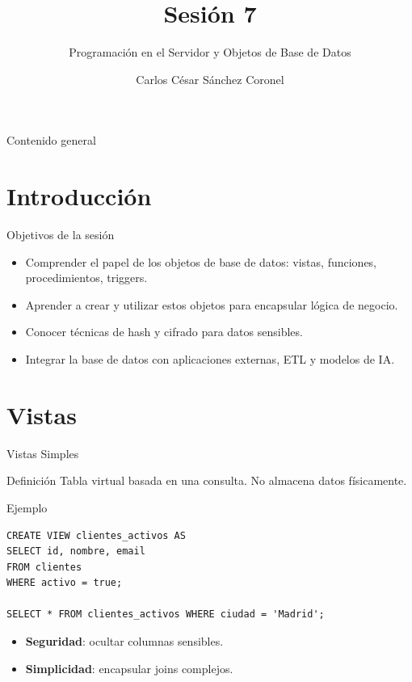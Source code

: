 \documentclass[aspectratio=169, 10pt, xcolor=table]{beamer}
\title[SESIÓN 7 BBDD]{\textbf{Sesión 7}}
\subtitle{Programación en el Servidor y Objetos de Base de Datos}
\author[Prof. C. Sánchez]{Carlos César Sánchez Coronel}
\institute{\textbf{BASES DE DATOS}}
\date{}
\begin{document}
\begin{frame}
    \titlepage
\end{frame}

\begin{frame}{Contenido general}
    \tableofcontents
\end{frame}

\section{Introducción}

\begin{frame}{Objetivos de la sesión}
    \begin{itemize}
        \item Comprender el papel de los objetos de base de datos: vistas, funciones, procedimientos, triggers.
        \item Aprender a crear y utilizar estos objetos para encapsular lógica de negocio.
        \item Conocer técnicas de hash y cifrado para datos sensibles.
        \item Integrar la base de datos con aplicaciones externas, ETL y modelos de IA.
    \end{itemize}
\end{frame}

\section{Vistas}

\begin{frame}[fragile]{Vistas Simples}
    \begin{block}{Definición}
        Tabla virtual basada en una consulta. No almacena datos físicamente.
    \end{block}
    \begin{exampleblock}{Ejemplo}
        \begin{lstlisting}
CREATE VIEW clientes_activos AS
SELECT id, nombre, email
FROM clientes
WHERE activo = true;

SELECT * FROM clientes_activos WHERE ciudad = 'Madrid';
        \end{lstlisting}
    \end{exampleblock}
    \begin{itemize}
        \item \textbf{Seguridad}: ocultar columnas sensibles.
        \item \textbf{Simplicidad}: encapsular joins complejos.
    \end{itemize}
\end{frame}
\end{document}

